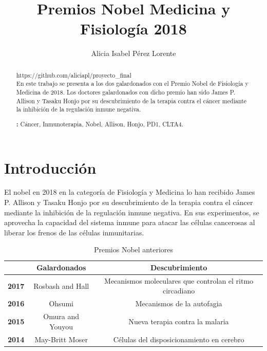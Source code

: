 \documentclass[]{article}
\newenvironment{keywords}
{\par\noindent\small\textbf{\keywordsname:}}
{\par}
\begin{document}

\title{Premios Nobel Medicina y Fisiología 2018 }

\author{Alicia Isabel Pérez Lorente}



\maketitle              


\begin{abstract} https://github.com/aliciapl/proyecto\_final \\
	En este trabajo se presenta a los dos galardonados con el Premio Nobel de Fisiología y Medicina de 2018. Los doctores galardonados con dicho premio han sido James P. Allison y Tasaku Honjo por su descubrimiento de la terapia contra el cáncer mediante la inhibición de la regulación inmune negativa.

\begin{keywords}
Cáncer, Inmunoterapia, Nobel, Allison, Honjo, PD1, CLTA4.
\end{keywords}


\end{abstract}


\section{Introducción}
El nobel en 2018 en la categoría de Fisiología y Medicina lo han recibido James P. Allison y Tasaku Honjo por su descubrimiento de la terapia contra el cáncer mediante la inhibición de la regulación inmune negativa. En sus experimentos, se aprovecha la capacidad del sistema inmune para atacar las células cancerosas al liberar los frenos de las células inmunitarias.

\begin{table}[!h]
	\centering
	\caption{Premios Nobel anteriores}
	\label{tab1}
	
	\begin{tabular}{c|c|c|}
		\cline{2-3}
		
		& \textbf{Galardonados} & \textbf{Descubrimiento} \\ \hline
		
		\multicolumn{1}{|c|}{\textbf{2017}} &   Rosbash and Hall                     &    Mecanismos moleculares que controlan el ritmo circadiano             \\ \hline
		\multicolumn{1}{|c|}{\textbf{2016}} &   Ohsumi                    &          Mecanismos de la autofagia             \\ \hline
		\multicolumn{1}{|c|}{\textbf{2015}} &     Omura and Youyou                 &          Nueva terapia contra la malaria             \\ \hline
		\multicolumn{1}{|c|}{\textbf{2014}} &         May-Britt Moser              &      Células del disposicionamiento en cerebro                 \\ \hline
	\end{tabular}%
	
\end{table}
\end{document}
